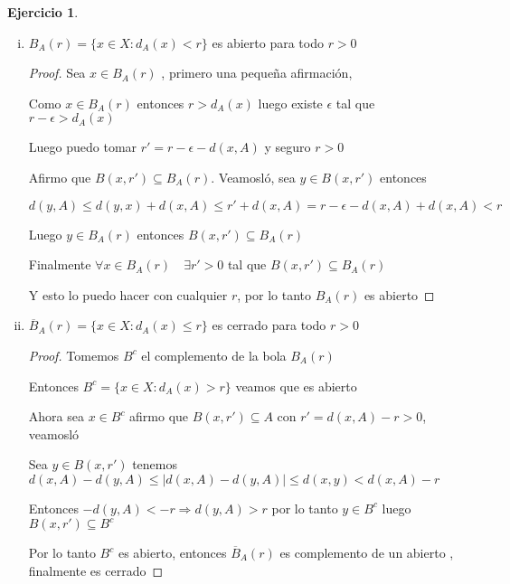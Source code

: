 \documentclass[12pt]{report}
\newcommand{\N}{\mathbb{N}}
\newcommand{\Ra}{\Rightarrow}
\newcommand{\ra}{\rightarrow}
\newcommand{\ol}{\overline}
\theoremstyle{definition}
\newtheorem{ej}{Ejercicio}
\begin{document}
\begin{ej}
\begin{enumerate}[i.]
\begin{proof}
	    Entonces existe un sucesión $d_n \in D^x \quad \forall n \in \N$ tal que $d_n \ra 0$

	    Luego para cada $n \in \N$  existe $a \in A$ tal que $d_n = d(x,a)$ llamemosló $a_n$ 

	    Por lo tanto $d(x,a_n)= d_n \ra 0 $ tenemos $a_n \in A \quad \forall n \in \N$ y además $a_n \ra x$

	     Finalmente $ x \in \ol A$

	     $\Leftarrow )$ Sea $x \in \ol A$ entonces existe $(x_n)_n \subseteq A$ tal que $x_n \ra x$

	     Entonces tenemos que $d(x_n,x) \ra 0$ por lo tanto tenemos $(d_n)_n \subseteq D^x$ tal que $d_n \ra 0$ pero además sabemos que 0 es cota inferiór entonces $0 = \inf D^x = d_{A}(x)$
	  \end{proof}
    \item $B_A(r) = \{x \in X : d_A(x) < r \}$ es abierto para todo $r>0$
      \begin{proof}
	Sea $x \in B_A(r)$ , primero una pequeña afirmación, 

	Como $x \in B_A(r)$ entonces $r > d_A(x) $ luego existe $\epsilon$ tal que $r - \epsilon > d_A(x)$

	Luego puedo tomar $r' = r  - \epsilon - d(x,A)$ y seguro $r > 0$

	Afirmo que $B(x,r') \subseteq B_A(r)$. Veamosló, sea $y \in B(x,r')$ entonces 

	$d(y,A) \leq d(y,x) + d(x,A) \leq r' + d(x,A) = r - \epsilon - d(x,A) + d(x,A) <r$

	Luego $y \in B_A(r)$ entonces $B(x,r') \subseteq B_A(r)$ 

	Finalmente $\forall x \in B_{A}(r) \quad \exists r' >0 $ tal que $B(x,r') \subseteq B_A(r)$ 

	Y esto lo puedo hacer con cualquier $r$, por lo tanto $B_A(r)$ es abierto
      \end{proof}
    \item $\ol B_{A}(r) = \{x \in X : d_A(x) \leq r\} $ es cerrado para todo $r>0$
      \begin{proof}
	      Tomemos $B^c$ el complemento de la bola $B_{A}(r)$

	      Entonces $B^c = \{x \in X : d_A(x) > r\}$ veamos que es abierto

	Ahora sea $x \in B^c$ afirmo que $B(x,r') \subseteq A$ con $r' = d(x,A) - r > 0 $, veamosló

	Sea $y \in B(x,r')$ tenemos $d(x,A) - d(y,A) \leq |d(x,A) - d(y,A)| \leq d(x,y) < d(x,A) -r $

      Entonces $-d(y,A) < -r \Ra d(y,A) > r$ por lo tanto $y \in B^c$ luego $B(x,r') \subseteq B^c$

      Por lo tanto $B^c$ es abierto, entonces $\ol B_A(r)$ es complemento de un abierto , finalmente es cerrado
      \end{proof}
  \end{enumerate}
\end{ej}
\end{document}
